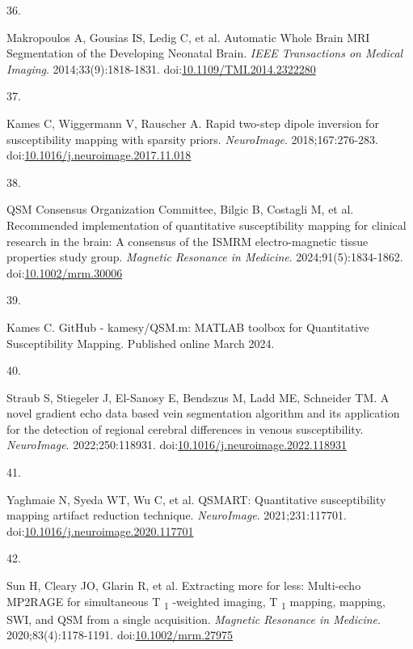 \documentclass[
  letterpaper,
  DIV=11,
  numbers=noendperiod]{scrartcl}
\newlength{\cslhangindent}
\newlength{\csllabelwidth}
\newenvironment{CSLReferences}[2] %
 {\begin{list}{}{%
  \setlength{\itemindent}{0pt}
  \setlength{\leftmargin}{0pt}
  \setlength{\parsep}{0pt}
  \ifodd #1
   \setlength{\leftmargin}{\cslhangindent}
   \setlength{\itemindent}{-1\cslhangindent}
  \fi
  \setlength{\itemsep}{#2\baselineskip}}}
 {\end{list}}
\newcommand{\CSLLeftMargin}[1]{\parbox[t]{\csllabelwidth}{\strut#1\strut}}
\newcommand{\CSLRightInline}[1]{\parbox[t]{\linewidth - \csllabelwidth}{\strut#1\strut}}
\begin{document}
\begin{CSLReferences}{0}{1}
\CSLLeftMargin{36. }%
\CSLRightInline{Makropoulos A, Gousias IS, Ledig C, et al. Automatic
{Whole Brain MRI Segmentation} of the {Developing Neonatal Brain}.
\emph{IEEE Transactions on Medical Imaging}. 2014;33(9):1818-1831.
doi:\href{https://doi.org/10.1109/TMI.2014.2322280}{10.1109/TMI.2014.2322280}}

\CSLLeftMargin{37. }%
\CSLRightInline{Kames C, Wiggermann V, Rauscher A. Rapid two-step dipole
inversion for susceptibility mapping with sparsity priors.
\emph{NeuroImage}. 2018;167:276-283.
doi:\href{https://doi.org/10.1016/j.neuroimage.2017.11.018}{10.1016/j.neuroimage.2017.11.018}}

\CSLLeftMargin{38. }%
\CSLRightInline{QSM Consensus Organization Committee, Bilgic B, Costagli
M, et al. Recommended implementation of quantitative susceptibility
mapping for clinical research in the brain: {A} consensus of the
{\textsc{ISMRM}} electro-magnetic tissue properties study group.
\emph{Magnetic Resonance in Medicine}. 2024;91(5):1834-1862.
doi:\href{https://doi.org/10.1002/mrm.30006}{10.1002/mrm.30006}}

\CSLLeftMargin{39. }%
\CSLRightInline{Kames C. {GitHub} - kamesy/{QSM}.m: {MATLAB} toolbox for
{Quantitative Susceptibility Mapping}. Published online March 2024.}

\CSLLeftMargin{40. }%
\CSLRightInline{Straub S, Stiegeler J, El-Sanosy E, Bendszus M, Ladd ME,
Schneider TM. A novel gradient echo data based vein segmentation
algorithm and its application for the detection of regional cerebral
differences in venous susceptibility. \emph{NeuroImage}.
2022;250:118931.
doi:\href{https://doi.org/10.1016/j.neuroimage.2022.118931}{10.1016/j.neuroimage.2022.118931}}

\CSLLeftMargin{41. }%
\CSLRightInline{Yaghmaie N, Syeda WT, Wu C, et al. {QSMART}:
{Quantitative} susceptibility mapping artifact reduction technique.
\emph{NeuroImage}. 2021;231:117701.
doi:\href{https://doi.org/10.1016/j.neuroimage.2020.117701}{10.1016/j.neuroimage.2020.117701}}

\CSLLeftMargin{42. }%
\CSLRightInline{Sun H, Cleary JO, Glarin R, et al. Extracting more for
less: Multi-echo {MP2RAGE} for simultaneous {T} {\textsubscript{1}}
-weighted imaging, {T} {\textsubscript{1}} mapping, mapping, {SWI}, and
{QSM} from a single acquisition. \emph{Magnetic Resonance in Medicine}.
2020;83(4):1178-1191.
doi:\href{https://doi.org/10.1002/mrm.27975}{10.1002/mrm.27975}}


\end{CSLReferences}
\end{document}

